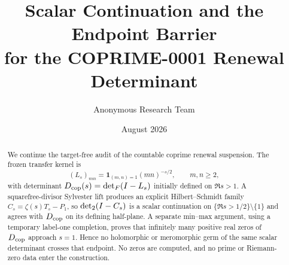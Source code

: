 \documentclass[11pt]{article}
\title{Scalar Continuation and the Endpoint Barrier\\
for the COPRIME-0001 Renewal Determinant}
\author{Anonymous Research Team}
\date{August 2026}
\theoremstyle{definition}
\begin{document}
\maketitle

\begin{abstract}
We continue the target-free audit of the countable coprime renewal
suspension.  The frozen transfer kernel is
\[
 (L_s)_{mn}=\mathbf 1_{(m,n)=1}(mn)^{-s/2},\qquad m,n\ge2,
\]
with determinant \(D_{\mathrm{cop}}(s)=\operatorname{det}_{F}(I-L_s)\) initially defined on
\(\Re s>1\).  A squarefree-divisor Sylvester lift produces an explicit
Hilbert--Schmidt family \(C_s=\zeta(s)T_s-P_1\), so
\(\operatorname{det}_{2}(I-C_s)\) is a scalar continuation on
\(\{\Re s>1/2\}\setminus\{1\}\) and agrees with \(D_{\mathrm{cop}}\) on its
defining half-plane.  A separate min--max argument, using a temporary
label-one completion, proves that infinitely many positive real zeros of
\(D_{\mathrm{cop}}\) approach \(s=1\).  Hence no holomorphic or meromorphic germ of
the same scalar determinant crosses that endpoint.  No zeros are computed,
and no prime or Riemann-zero data enter the construction.
\end{abstract}







\appendix

\end{document}
